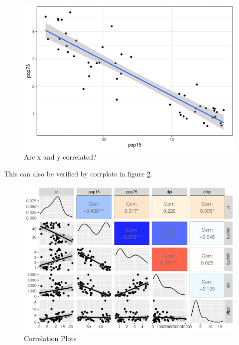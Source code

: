 \documentclass[
]{book}
\begin{document}
\begin{figure}

{\centering \includegraphics[height=0.3\textheight]{DauR_files/figure-latex/multi2-1} 

}

\caption{Are x and y correlated?}\label{fig:multi2}
\end{figure}

This can also be verified by corrplots in figure \ref{fig:corrp}.

\begin{figure}

{\centering \includegraphics[height=0.45\textheight]{DauR_files/figure-latex/corrp-1} 

}

\caption{Correlation Plots}\label{fig:corrp}
\end{figure}
\end{document}
